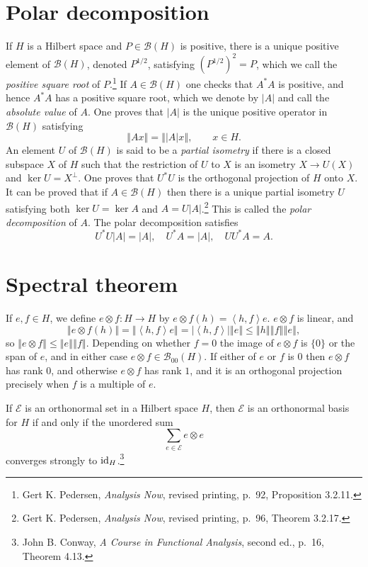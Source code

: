 \documentclass{article}
\newcommand{\inner}[2]{\left\langle #1, #2 \right\rangle}
\newcommand{\id}{\ensuremath\mathrm{id}}
\newcommand{\norm}[1]{\left\Vert #1 \right\Vert}
\theoremstyle{definition}
\begin{document}
\section{Polar decomposition}
If $H$ is a Hilbert space and $P \in \mathscr{B}(H)$ is positive, there is a unique positive element of $\mathscr{B}(H)$, denoted $P^{1/2}$, satisfying
$(P^{1/2})^2=P$, which we call the {\em positive square root} of $P$.\footnote{Gert K. Pedersen,
{\em Analysis Now}, revised printing, p.~92, Proposition 3.2.11.} If $A \in \mathscr{B}(H)$ one checks that $A^*A$ is positive, and hence 
$A^*A$ has a positive square root, which we denote by $|A|$ and call the {\em absolute value} of $A$. One proves that
$|A|$ is the unique positive operator in $\mathscr{B}(H)$ satisfying
\[
\norm{Ax} = \norm{|A|x}, \qquad x \in H.
\]
An element $U$ of $\mathscr{B}(H)$ is said to be a {\em partial isometry} if there is a closed subspace $X$ of $H$ such that the restriction of $U$ to $X$ is an isometry
$X \to U(X)$ and $\ker U = X^\perp$. One proves that $U^*U$ is the orthogonal projection of $H$ onto $X$. It can be proved that if $A \in \mathscr{B}(H)$ then there is a unique partial isometry
$U$ satisfying both $\ker U= \ker A$ and $A=U|A|$.\footnote{Gert K. Pedersen, {\em Analysis Now}, revised printing, p.~96, Theorem 3.2.17.} This is called the {\em polar decomposition} of $A$. The
polar decomposition satisfies
\[
U^*U|A|=|A|, \quad U^*A=|A|, \quad UU^*A=A.
\]



\section{Spectral theorem}
If $e,f \in H$, we define $e \otimes f:H \to H$ by $e \otimes f (h) = \inner{h}{f}e$. $e \otimes f$ is linear, and
\[
\norm{e \otimes f (h)} = \norm{\inner{h}{f}e}= |\inner{h}{f}| \norm{e} \leq \norm{h}\norm{f}\norm{e},
\]
so $\norm{e \otimes f} \leq \norm{e} \norm{f}$. Depending on whether $f=0$ the image of $e \otimes f$ is $\{0\}$ or the span
of $e$,  and in either case $e \otimes f \in \mathscr{B}_{00}(H)$. If either of $e$ or $f$ is $0$ then $e \otimes f$ has rank $0$,
and otherwise $e \otimes f$ has rank $1$, and it is an orthogonal projection precisely when $f$ is a multiple of $e$. 

If $\mathscr{E}$ is an orthonormal set in a Hilbert space $H$, then $\mathscr{E}$ is an orthonormal basis for $H$ if and only if the unordered sum
\[
\sum_{e \in \mathscr{E}} e \otimes e
\]
converges strongly to $\id_H$.\footnote{John B. Conway, {\em A Course in Functional Analysis}, second ed., p.~16, Theorem 4.13.}
\end{document}
